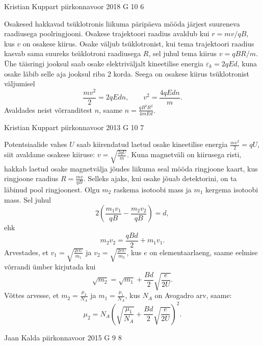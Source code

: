 \documentclass[11pt, twoside]{article}
\begin{document}
{%
{Kristian Kuppart} %
{piirkonnavoor} %
{2018} %
{G 10} %
{6} %
{

\ifSolution
Osakesed hakkavad tsüklotronis liikuma päripäeva mööda järjest suureneva raadiusega poolringjooni. Osakese trajektoori raadius avaldub kui $r=mv/qB$, kus $v$ on osakese kiirus. Osake väljub tsüklotronist, kui tema trajektoori raadius kasvab sama suureks tsüklotroni raadiusega $R$, sel juhul tema kiirus $v=qBR/m$. Ühe täisringi jooksul saab osake elektriväljalt kineetilise energia $\varepsilon_k=2qEd$, kuna osake läbib selle aja jooksul riba 2 korda. Seega on osakese kiirus tsüklotronist väljumisel
\[\frac{mv^2}{2}=2qEdn, \qquad v^2=\frac{4qEdn}{m}.\]
Avaldades neist võrranditest $n$, saame $\displaystyle n=\frac{qB^2R^2}{4mEd}$.
\fi
}

{Kristian Kuppart} %
{piirkonnavoor} %
{2013} %
{G 10} %
{7} %
{

\ifSolution
Potentsiaalide vahes $U$ saab kiirendatud laetud osake kineetilise
energia $\frac{mv^{2}}{2}=qU$, siit avaldame osakese kiiruse: $v=\sqrt{\frac{2qU}{m}}$. Kuna magnetväli on kiirusega risti, hakkab laetud osake 
magnetvälja jõudes liikuma seal mööda ringjoone kaart, kus ringjoone raadius
$R=\frac{mv}{qB}$. Selleks ajaks, kui osake jõuab detektorini,
on ta läbinud pool ringjoonest. Olgu $m_{2}$ raskema isotoobi
mass ja $m_{1}$ kergema isotoobi mass. Sel juhul 
\[ 
2\left(\frac{m_{1}v_{1}}{qB}-\frac{m_{2}v_{2}}{qB}\right)=d, 
\]
ehk
\[ 
m_{2}v_{2}=\frac{qBd}{2}+m_{1}v_{1 }.
\]
Arvestades, et $v_{1}=\sqrt{\frac{2eU}{m_{1}}}$ ja $v_{2}=\sqrt{\frac{2eU}{m_{2}}}$,
kus $e$ on elementaarlaeng, saame eelmise võrrandi ümber kirjutada kui
\[ \sqrt{m_{2}}=\sqrt{m_{1}}+\frac{Bd}{2}\sqrt{\frac{e}{2U}}. \]
Võttes arvesse, et $m_{2}=\frac{\mu_{2}}{N_{A}}$ ja $m_{1}=\frac{\mu_{1}}{N_{A}}$,
kus $N_{A}$ on Avogadro arv, saame:
\[ \mu_{2}=N_{A}\left(\sqrt{\frac{\mu_{1}}{N_{A}}}+\frac{Bd}{2}\sqrt{\frac{e}{2U}}\right)^{2}.\]
\fi
}

{Jaan Kalda} %
{piirkonnavoor} %
{2015} %
{G 9} %
{8} %
{

}}
\end{document}
